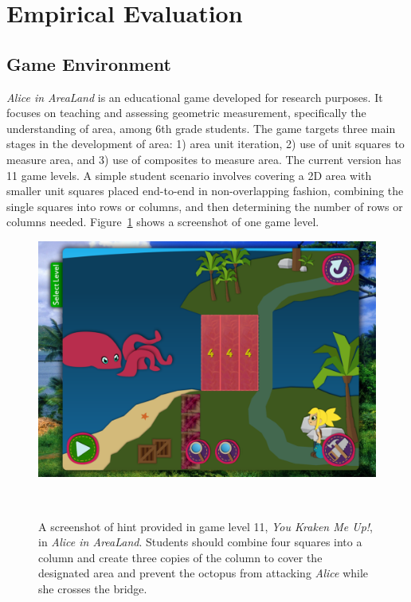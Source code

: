 \documentclass{sigchi}
\begin{document}
\section{Empirical Evaluation}

\subsection{Game Environment}
\textit {Alice in AreaLand} is an educational game developed for research purposes. It focuses on teaching and assessing geometric measurement, specifically the understanding of area, among 6th grade students. The game targets three main stages in the development of area: 1) area unit iteration, 2) use of unit squares to measure area, and 3) use of composites to measure area. The current version has 11 game levels. A simple student scenario involves covering a 2D area with smaller unit squares placed end-to-end in non-overlapping fashion, combining the single squares into rows or columns, and then determining the number of rows or columns needed. Figure~\ref{fig:figurekracken} shows a screenshot of one game level.

\begin{figure}
	\centering
	\includegraphics[width=0.9\columnwidth]{figures/kracken}
	\caption{A screenshot of hint provided in game level 11, \textit {You Kraken Me Up!}, in \textit {Alice in AreaLand}. Students should combine four squares into a column and create three copies of the column to cover the designated area and prevent the octopus from attacking \textit {Alice} while she crosses the bridge.}~\label{fig:figurekracken}
\end{figure}
\end{document}
